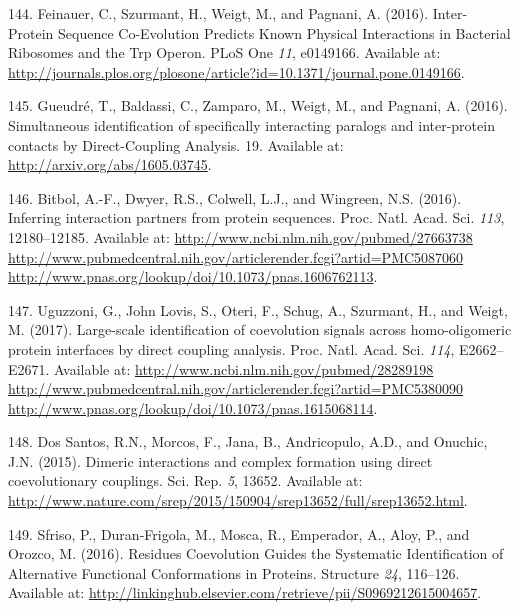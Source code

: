 \documentclass[11pt,a4paper,twoside]{book}
\theoremstyle{definition}
\theoremstyle{definition}
\theoremstyle{remark}
\begin{document}
\hypertarget{ref-Feinauer2016a}{}
144. Feinauer, C., Szurmant, H., Weigt, M., and Pagnani, A. (2016).
Inter-Protein Sequence Co-Evolution Predicts Known Physical Interactions
in Bacterial Ribosomes and the Trp Operon. PLoS One \emph{11}, e0149166.
Available at:
\url{http://journals.plos.org/plosone/article?id=10.1371/journal.pone.0149166}.

\hypertarget{ref-Gueudre2016}{}
145. Gueudré, T., Baldassi, C., Zamparo, M., Weigt, M., and Pagnani, A.
(2016). Simultaneous identification of specifically interacting paralogs
and inter-protein contacts by Direct-Coupling Analysis. 19. Available
at: \url{http://arxiv.org/abs/1605.03745}.

\hypertarget{ref-Bitbol2016}{}
146. Bitbol, A.-F., Dwyer, R.S., Colwell, L.J., and Wingreen, N.S.
(2016). Inferring interaction partners from protein sequences. Proc.
Natl. Acad. Sci. \emph{113}, 12180--12185. Available at:
\href{http://www.ncbi.nlm.nih.gov/pubmed/27663738\%20http://www.pubmedcentral.nih.gov/articlerender.fcgi?artid=PMC5087060\%20http://www.pnas.org/lookup/doi/10.1073/pnas.1606762113}{http://www.ncbi.nlm.nih.gov/pubmed/27663738 http://www.pubmedcentral.nih.gov/articlerender.fcgi?artid=PMC5087060 http://www.pnas.org/lookup/doi/10.1073/pnas.1606762113}.

\hypertarget{ref-Uguzzoni2017}{}
147. Uguzzoni, G., John Lovis, S., Oteri, F., Schug, A., Szurmant, H.,
and Weigt, M. (2017). Large-scale identification of coevolution signals
across homo-oligomeric protein interfaces by direct coupling analysis.
Proc. Natl. Acad. Sci. \emph{114}, E2662--E2671. Available at:
\href{http://www.ncbi.nlm.nih.gov/pubmed/28289198\%20http://www.pubmedcentral.nih.gov/articlerender.fcgi?artid=PMC5380090\%20http://www.pnas.org/lookup/doi/10.1073/pnas.1615068114}{http://www.ncbi.nlm.nih.gov/pubmed/28289198 http://www.pubmedcentral.nih.gov/articlerender.fcgi?artid=PMC5380090 http://www.pnas.org/lookup/doi/10.1073/pnas.1615068114}.

\hypertarget{ref-DosSantos2015a}{}
148. Dos Santos, R.N., Morcos, F., Jana, B., Andricopulo, A.D., and
Onuchic, J.N. (2015). Dimeric interactions and complex formation using
direct coevolutionary couplings. Sci. Rep. \emph{5}, 13652. Available
at:
\url{http://www.nature.com/srep/2015/150904/srep13652/full/srep13652.html}.

\hypertarget{ref-Sfriso2016}{}
149. Sfriso, P., Duran-Frigola, M., Mosca, R., Emperador, A., Aloy, P.,
and Orozco, M. (2016). Residues Coevolution Guides the Systematic
Identification of Alternative Functional Conformations in Proteins.
Structure \emph{24}, 116--126. Available at:
\url{http://linkinghub.elsevier.com/retrieve/pii/S0969212615004657}.
\end{document}
